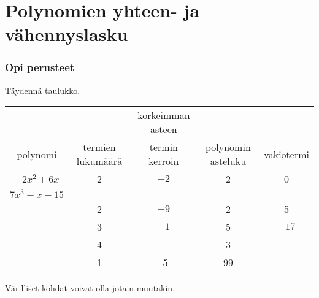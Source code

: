 \section{Polynomien yhteen- ja vähennyslasku}



\Harjoitustehtavat

\subsubsection*{Opi perusteet}

\begin{tehtava}
    Täydennä taulukko.
        
    \begin{tabular}{|c|c|c|c|c|}
                                                                                           \hline
             &                   & korkeimman asteen &                     &            \\
polynomi     & termien lukumäärä & termin kerroin    & polynomin asteluku  & vakiotermi \\ \hline
$-2x^2+6x$   &        2          &         $-2$      &       2             &    0       \\ \hline 
$7x^3-x-15$  &                   &                   &                     &            \\ \hline 
             &        2          &          $-9$     &       2             &    5       \\ \hline 
             &        3          &          $-1$     &       5             &    $-17$   \\ \hline 
             &        4          &                   &       3             &            \\ \hline 
             &        1          &          -5       &       99            &            \\ \hline                           
    \end{tabular}
    \begin{vastaus}
    Värilliset kohdat voivat olla jotain muutakin.
    

\end{vastaus}
\end{tehtava}
